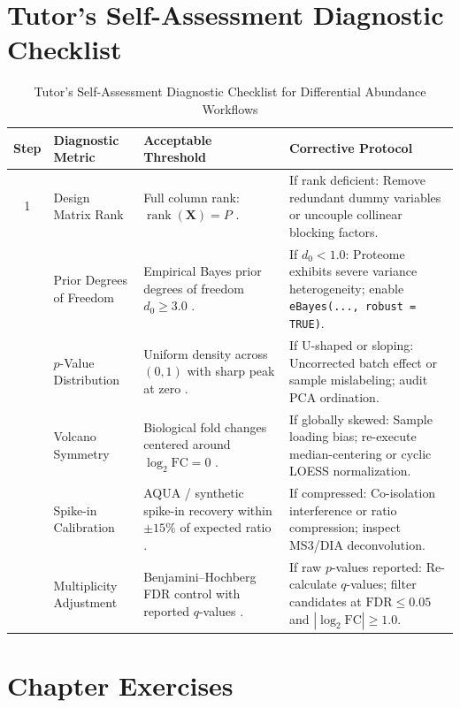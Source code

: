\documentclass[11pt,twoside,openright]{book}
\begin{document}
\section{Tutor's Self-Assessment Diagnostic Checklist}

\begin{table}[ht]
\centering
\caption{Tutor's Self-Assessment Diagnostic Checklist for Differential Abundance Workflows}
\label{tab:diff_checklist}
\small
\begin{tabularx}{\textwidth}{c p{3.8cm} p{4.2cm} X}
\toprule
\textbf{Step} & \textbf{Diagnostic Metric} & \textbf{Acceptable Threshold} & \textbf{Corrective Protocol} \\
\midrule
1 & Design Matrix Rank & Full column rank: $\operatorname{rank}(\mathbf{X}) = P$ \cite{smyth2004linear}. & If rank deficient: Remove redundant dummy variables or uncouple collinear blocking factors. \\
\addlinespace
2 & Prior Degrees of Freedom & Empirical Bayes prior degrees of freedom $d_0 \ge 3.0$ \cite{phipson2016robust}. & If $d_0 < 1.0$: Proteome exhibits severe variance heterogeneity; enable \texttt{eBayes(..., robust = TRUE)}. \\
\addlinespace
3 & $p$-Value Distribution & Uniform density across $(0, 1)$ with sharp peak at zero \cite{efron2004large}. & If U-shaped or sloping: Uncorrected batch effect or sample mislabeling; audit PCA ordination. \\
\addlinespace
4 & Volcano Symmetry & Biological fold changes centered around $\log_2 \text{FC} = 0$ \cite{bruderer2015extending}. & If globally skewed: Sample loading bias; re-execute median-centering or cyclic LOESS normalization. \\
\addlinespace
5 & Spike-in Calibration & AQUA / synthetic spike-in recovery within $\pm 15\%$ of expected ratio \cite{navarro2016multicenter}. & If compressed: Co-isolation interference or ratio compression; inspect MS3/DIA deconvolution. \\
\addlinespace
6 & Multiplicity Adjustment & Benjamini--Hochberg FDR control with reported $q$-values \cite{benjamini1995controlling}. & If raw $p$-values reported: Re-calculate $q$-values; filter candidates at $\text{FDR} \le 0.05$ and $|\log_2 \text{FC}| \ge 1.0$. \\
\bottomrule
\end{tabularx}
\end{table}

\section{Chapter Exercises}
\end{document}
